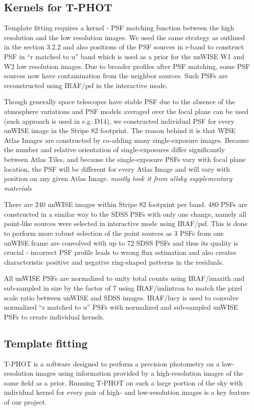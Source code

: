\documentclass[apj,iop]{emulateapj}
\begin{document}
\subsection{Kernels for T-PHOT}

Template fitting requires a kernel - PSF matching function between the high resolution and the low resolution images. We used the same strategy as outlined in the section 3.2.2 and also positions of the PSF sources in r-band to construct PSF in ``r matched to u'' band which is used as a prior for the unWISE W1 and W2 low resolution images. Due to broader profiles after PSF matching, some PSF sources now have contamination from the neighbor sources. Such PSFs are reconstructed using IRAF/psf in the interactive mode.

Though generally space telescopes have stable PSF due to the absence of the atmosphere variations and PSF models averaged over the focal plane can be used (such approach is used in e.g. D14), we constructed individual PSF for every unWISE image in the Stripe 82 footprint. The reason behind it is that WISE Atlas Images are constructed by co-adding many single-exposure images. Because the number and relative orientation of single-exposures differ significantly between Atlas Tiles, and because the single-exposure PSFs vary with focal plane location, the PSF will be different for every Atlas Image and will vary with position on any given Atlas Image. \textit{mostly took it from allsky supplementary materials}

There are 240 unWISE images within Stripe 82 footprint per band. 480 PSFs are constructed in a similar way to the SDSS PSFs with only one change, namely all point-like sources were selected in interactive mode using IRAF/psf. This is done to perform more robust selection of the point sources as 3 PSFs from one unWISE frame are convolved with up to 72 SDSS PSFs and thus its quality is crucial - incorrect PSF profile leads to wrong flux estimation and also creates characteristic positive and negative ring-shaped patterns in the residuals.

All unWISE PSFs are normalized to unity total counts using IRAF/imarith and sub-sampled in size by the factor of 7 using IRAF/imlintran to match the pixel scale ratio between unWISE and SDSS images. IRAF/lucy is used to convolve normalized ``r matched to u'' PSFs with normalized and sub-sampled unWISE PSFs to create individual kernels.

\subsection{Template fitting}
T-PHOT is a software designed to perform a precision photometry on a low-resolution images using information provided by a high-resolution images of the same field as a prior. Running T-PHOT on such a large portion of the sky with individual kernel for every pair of high- and low-resolution images is a key feature of our project.
\end{document}

